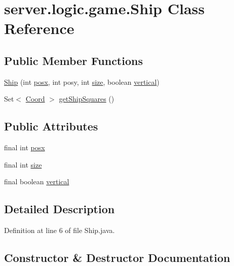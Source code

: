 \hypertarget{classserver_1_1logic_1_1game_1_1_ship}{}\section{server.\+logic.\+game.\+Ship Class Reference}
\label{classserver_1_1logic_1_1game_1_1_ship}
\subsection*{Public Member Functions}
\begin{DoxyCompactItemize}
\item 
\hyperlink{classserver_1_1logic_1_1game_1_1_ship_a601660159810b480fd890c89df9889c2}{Ship} (int \hyperlink{classserver_1_1logic_1_1game_1_1_ship_a6cd98fad481d08143ecd02a2f3a03e0b}{posx}, int posy, int \hyperlink{classserver_1_1logic_1_1game_1_1_ship_a55a1cc2a311ddaf3a469c5483b137cbf}{size}, boolean \hyperlink{classserver_1_1logic_1_1game_1_1_ship_aea5b5600ee416202bf8dd935a21fc6be}{vertical})
\item 
Set$<$ \hyperlink{classsharedlib_1_1utils_1_1_coord}{Coord} $>$ \hyperlink{classserver_1_1logic_1_1game_1_1_ship_a2fd48307f52252c86d63b81456096b1e}{get\+Ship\+Squares} ()
\end{DoxyCompactItemize}
\subsection*{Public Attributes}
\begin{DoxyCompactItemize}
\item 
final int \hyperlink{classserver_1_1logic_1_1game_1_1_ship_a6cd98fad481d08143ecd02a2f3a03e0b}{posx}
\item 
final int \hyperlink{classserver_1_1logic_1_1game_1_1_ship_a55a1cc2a311ddaf3a469c5483b137cbf}{size}
\item 
final boolean \hyperlink{classserver_1_1logic_1_1game_1_1_ship_aea5b5600ee416202bf8dd935a21fc6be}{vertical}
\end{DoxyCompactItemize}


\subsection{Detailed Description}


Definition at line 6 of file Ship.\+java.



\subsection{Constructor \& Destructor Documentation}
\hypertarget{classserver_1_1logic_1_1game_1_1_ship_a601660159810b480fd890c89df9889c2}{}\label{classserver_1_1logic_1_1game_1_1_ship_a601660159810b480fd890c89df9889c2} 
